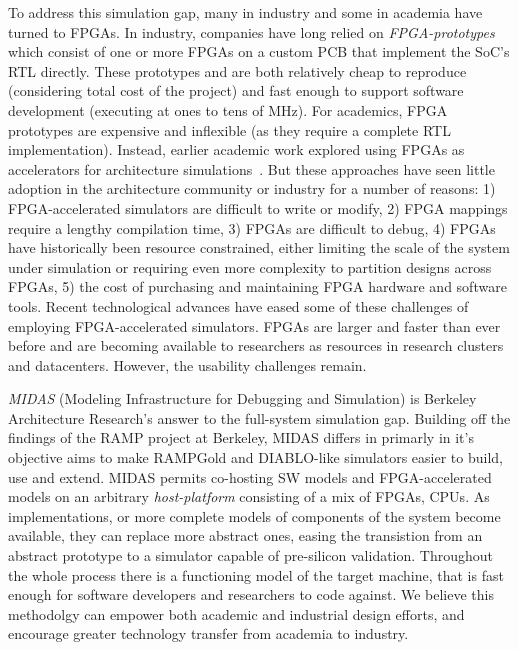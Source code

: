 To address this simulation gap, many in industry and some in academia have
turned to FPGAs. In industry, companies have long relied on
\emph{FPGA-prototypes} which consist of one or more FPGAs on a custom PCB that
implement the SoC's RTL directly. These prototypes and are both relatively
cheap to reproduce (considering total cost of the project) and fast enough to
support software development (executing at ones to tens of MHz). For academics,
FPGA prototypes are expensive and inflexible (as they require a complete RTL
implementation). Instead, earlier academic work explored using FPGAs as
accelerators for architecture simulations~\cite{fast, fame, hasim,
protoflex,ramp}.  But these approaches have seen little adoption in the
architecture community or industry for a number of reasons: 1) FPGA-accelerated
simulators are difficult to write or modify, 2) FPGA mappings require a lengthy
compilation time, 3) FPGAs are difficult to debug, 4) FPGAs have historically
been resource constrained, either limiting the scale of the system under
simulation or requiring even more complexity to partition designs across FPGAs,
5) the cost of purchasing and maintaining FPGA hardware and software tools.
Recent technological advances have eased some of these challenges of employing
FPGA-accelerated simulators. FPGAs are larger and faster than ever before and
are becoming available to researchers as resources in research
clusters\cite{catapultannounce} and datacenters\cite{amazonf1}.  However, the
usability challenges remain.

\emph{MIDAS} (Modeling Infrastructure for Debugging and Simulation) is Berkeley
Architecture Research's answer to the full-system simulation gap.  Building off
the findings of the RAMP\cite{ramp} project at Berkeley, MIDAS differs in
primarly in it's objective aims to make RAMPGold\cite{rampgold} and
DIABLO\cite{diablo}-like simulators easier to build, use and extend. MIDAS
permits co-hosting SW models and FPGA-accelerated models on an arbitrary
\emph{host-platform} consisting of a mix of FPGAs, CPUs. As implementations, or
more complete models of components of the system become available, they can
replace more abstract ones, easing the transistion from an abstract prototype
to a simulator capable of pre-silicon validation. Throughout the whole process
there is a functioning model of the target machine, that is fast enough for
software developers and researchers to code against. We believe this methodolgy
can empower both academic and industrial design efforts, and encourage greater
technology transfer from academia to industry.

